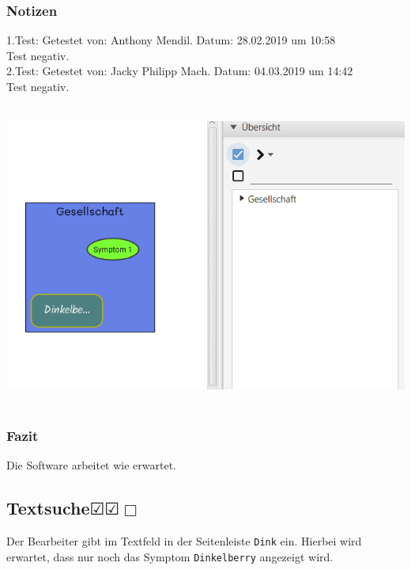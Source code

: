\documentclass[enabledeprecatedfontcommands]{scrartcl}
\newcommand{\subsectiont}[2]{\subsection[#1]{#1{\normalsize\normalfont #2}}}
\newcommand{\leer}{$\Box$}
\newcommand{\ok}{$\CheckedBox$}
\begin{document}
\subsubsection{Notizen}
1.Test: Getestet von: Anthony Mendil. Datum: 28.02.2019 um 10:58 \\
Test negativ. \\
2.Test: Getestet von: Jacky Philipp Mach. Datum: 04.03.2019 um 14:42 \\
Test negativ.
\begin{center}
\includegraphics[height=10cm]{relationFiltern.PNG}
\end{center}
\subsubsection{Fazit}
Die Software arbeitet wie erwartet.

\subsectiont{Textsuche}{\dotfill\ok\ok\leer}
Der Bearbeiter gibt im Textfeld in der Seitenleiste \texttt{Dink} ein. Hierbei wird erwartet, dass nur noch das Symptom \texttt{Dinkelberry} angezeigt wird.
\end{document}
